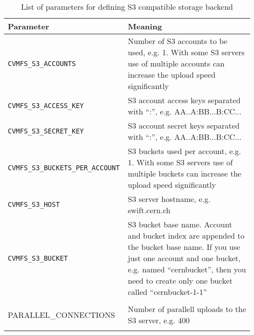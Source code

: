 	\begin{longtable}{lX}
		\toprule
		{\bf\centering Parameter} 			& {\bf\centering Meaning}\\
		\midrule
                \tt CVMFS\_S3\_ACCOUNTS & Number of S3 accounts to be used, e.g. 1. With some S3 servers use of multiple accounts can increase the upload speed significantly\\
                \tt CVMFS\_S3\_ACCESS\_KEY & S3 account access keys separated with ``:'', e.g. AA..A:BB...B:CC...\\
                \tt CVMFS\_S3\_SECRET\_KEY & S3 account secret keys separated with ``:'', e.g. AA..A:BB...B:CC...\\
                \tt CVMFS\_S3\_BUCKETS\_PER\_ACCOUNT & S3 buckets used per account, e.g. 1. With some S3 servers use of multiple buckets can increase the upload speed significantly\\
                \tt CVMFS\_S3\_HOST & S3 server hostname, e.g. swift.cern.ch\\
                \tt CVMFS\_S3\_BUCKET & S3 bucket base name. Account and bucket index are appended to the bucket base name. If you use just one account and one bucket, e.g. named ``cernbucket'', then you need to create only one bucket called ``cernbucket-1-1''\\
                \tt \begin{tabular}[t]{@{}l@{}}CVMFS\_S3\_MAX\_NUMBER\_OF\_\\PARALLEL\_CONNECTIONS\end{tabular} & Number of parallell uploads to the S3 server, e.g. 400\\
		\bottomrule
	\caption{List of parameters for defining S3 compatible storage backend}
	\label{tbl:s3confparameters}
	\end{longtable}
